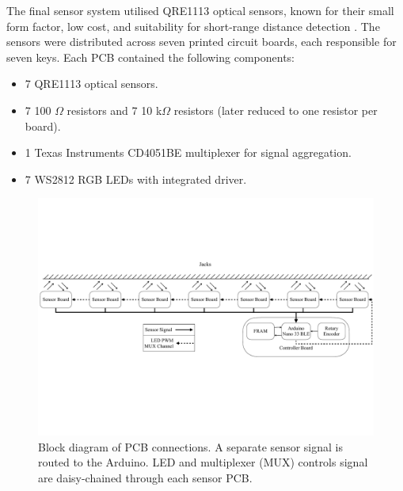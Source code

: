 The final sensor system utilised QRE1113 optical sensors, known for their small form factor, low cost, and suitability for short-range distance detection \cite{McPherson2013, McPherson2019}. The sensors were distributed across seven printed circuit boards, each responsible for seven keys. Each PCB contained the following components:

\begin{itemize}
    \item 7 QRE1113 optical sensors.
    \item 7 100 $\Omega$ resistors and 7 10 k$\Omega$ resistors (later reduced to one resistor per board).
    \item 1 Texas Instruments CD4051BE multiplexer for signal aggregation.
    \item 7 WS2812 RGB LEDs with integrated driver.
\end{itemize}

\begin{figure}
    \centering
    \includegraphics[width=\linewidth]{src/images/block-diagram-2.pdf}
    \caption{Block diagram of PCB connections. A separate sensor signal is routed to the Arduino. LED and multiplexer (MUX) controls signal are daisy-chained through each sensor PCB.}
    \label{fig:system-block-diagram}
\end{figure}

